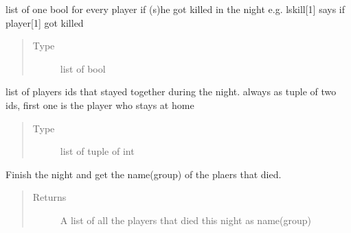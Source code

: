\documentclass[letterpaper,10pt,english]{sphinxmanual}
\begin{document}
\begin{fulllineitems}
\begin{fulllineitems}
\begin{quote}
\begin{description}
\end{description}\end{quote}

\end{fulllineitems}


\begin{fulllineitems}
\label{\detokenize{chatwolf:chatwolf.nightactions.Nightactions.lskill}}
list of one bool for every player if (s)he got killed in the night
e.g. lskill{[}1{]} says if player{[}1{]} got killed
\begin{quote}\begin{description}
\item[{Type}] \leavevmode
list of bool

\end{description}\end{quote}

\end{fulllineitems}


\begin{fulllineitems}
\label{\detokenize{chatwolf:chatwolf.nightactions.Nightactions.lstogether}}
list of players ids that stayed together during the night.
always as tuple of two ids, first one is the player who stays at home
\begin{quote}\begin{description}
\item[{Type}] \leavevmode
list of tuple of int

\end{description}\end{quote}

\end{fulllineitems}


\begin{fulllineitems}
\label{\detokenize{chatwolf:chatwolf.nightactions.Nightactions.finish_night}}
Finish the night and get the name(group) of the plaers that died.
\begin{quote}\begin{description}
\item[{Returns}] \leavevmode
A list of all the players that died this night as name(group)


\end{description}
\end{quote}
\end{fulllineitems}
\end{fulllineitems}
\end{document}
